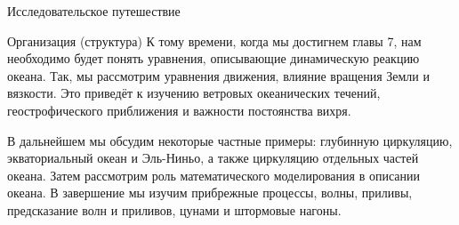 \begin{chapter}{Исследовательское путешествие}
\begin{section}{Организация (структура)}
К тому времени, когда мы достигнем главы 7, нам необходимо будет понять 
уравнения, описывающие динамическую реакцию океана. Так, мы рассмотрим 
уравнения движения, влияние вращения Земли и вязкости. Это приведёт к 
изучению ветровых океанических течений, геострофического приближения и важности 
постоянства вихря.
%

В дальнейшем мы обсудим некоторые частные примеры: глубинную циркуляцию, 
экваториальный океан и Эль-Ниньо, а также циркуляцию отдельных частей океана. 
Затем рассмотрим роль математического моделирования в описании океана. 
В завершение мы изучим прибрежные процессы, волны, приливы, предсказание волн 
и приливов, цунами и штормовые нагоны.
%
\end{section}


\end{chapter}
